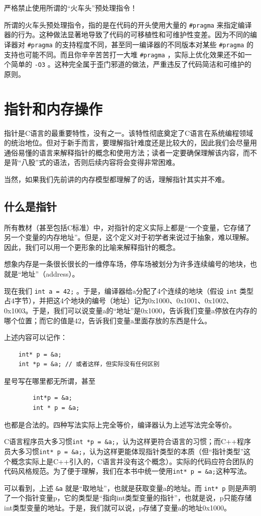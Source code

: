 \begin{warning}
  严格禁止使用所谓的“火车头”预处理指令！

  所谓的火车头预处理指令，指的是在代码的开头使用大量的 \texttt{\#pragma} 来指定编译器的行为。这种做法显著地导致了代码的可移植性和可维护性变差。因为不同的编译器对 \texttt{\#pragma} 的支持程度不同，甚至同一编译器的不同版本对某些 \texttt{\#pragma} 的支持也可能不同。而且你辛辛苦苦打一大堆 \texttt{\#pragma} ，实际上优化效果还不如一个简单的 \texttt{-O3} 。这种完全属于歪门邪道的做法，严重违反了代码简洁和可维护的原则。
\end{warning}

\section{指针和内存操作}

指针是C语言的最重要特性，没有之一。该特性彻底奠定了C语言在系统编程领域的统治地位。但对于新手而言，要理解指针难度还是比较大的，因此我们会尽量用通俗易懂的语言来解释指针的概念和使用方法；读者一定要确保理解该内容，而不是背“八股”式的语法，否则后续内容将会变得非常困难。

当然，如果我们先前讲的内存模型都理解了的话，理解指针其实并不难。

\subsection{什么是指针}

所有教材（甚至包括C标准）中，对指针的定义实际上都是“一个变量，它存储了另一个变量的内存地址”。但是，这个定义对于初学者来说过于抽象，难以理解。因此，我们可以用一个更形象的比喻来解释指针的概念。

想象内存是一条很长很长的一维停车场，停车场被划分为许多连续编号的地块，也就是“地址”（address）。

现在我们 \texttt{int a = 42;} 。于是，编译器给a分配了4个连续的地块（假设 \texttt{int} 类型占4字节），并把这4个地块的编号（地址）记为0x1000、0x1001、0x1002、0x1003。于是，我们可以说变量a的“地址”是0x1000，告诉我们变量a停放在内存的哪个位置；而它的值是42，告诉我们变量a里面存放的东西是什么。

上述内容可以记作：
\begin{verbatim}
    int* p = &a;
    int *p = &a; // 或者这样，但实际没有任何区别
\end{verbatim}
\begin{note}
    星号写在哪里都无所谓，甚至
    \begin{verbatim}
        int*p = &a;
        int * p = &a;
    \end{verbatim}
    也都是合法的。四种写法实际上完全等价，编译器认为上述写法完全等价。
    
    C语言程序员大多习惯\verb|int *p = &a;|，认为这样更符合语言的习惯；而C++程序员大多习惯\verb|int* p = &a;|，认为这样更能体现指针类型的本质（但“指针类型”这个概念实际上是C++引入的，C语言并没有这个概念）。实际的代码应符合团队的代码风格规范。为了便于理解，我们在本书中统一使用\verb|int* p = &a;|这种写法。
\end{note}
可以看到，上述 \texttt{\&a} 就是“取地址”，也就是获取变量a的地址。而 \texttt{int* p} 则是声明了一个指针变量p，它的类型是“指向int类型变量的指针”，也就是说，p只能存储int类型变量的地址。于是，我们就可以说，p存储了变量a的地址0x1000。

